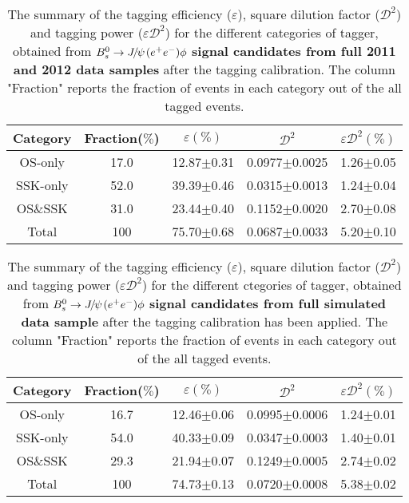 \begin{table}[htb]
  \caption{
   The summary of the tagging efficiency ($\varepsilon$), square dilution factor ($\mathcal{D}^{2}$) and tagging power ($\varepsilon\mathcal{D}^{2}$) for the different categories of tagger, obtained from ${{B}^0_{s}}\rightarrow{\ensuremath{{J\mskip -3mu/\mskip -2mu\psi\mskip 2mu}}}({e^+e^-})\phi$ {\bf signal candidates from full 2011 and 2012 data samples} after the tagging calibration. The column "Fraction" reports the fraction of events in each category out of the all tagged events. }
    \small{
\begin{center}\begin{tabular}{ccccc}
   \hline
    Category & Fraction($\%$)&$\varepsilon(\%)$ & $\mathcal{D}^{2}$ & $\varepsilon\mathcal{D}^{2}(\%)$\\
  \hline
    OS-only& 17.0 &12.87$\pm$0.31 &  0.0977$\pm$0.0025  &1.26$\pm$0.05 \\
     SSK-only& 52.0 &39.39$\pm$0.46 & 0.0315$\pm$0.0013 & 1.24$\pm$0.04 \\
     OS$\&$SSK& 31.0 &23.44$\pm$0.40 &  0.1152$\pm$0.0020  &2.70$\pm$0.08 \\
    \hline
     Total& 100 &75.70$\pm$0.68 & 0.0687$\pm$0.0033 & 5.20$\pm$0.10 \\
    \hline
    \end{tabular}\end{center}
  }
\label{tab:FTperformanceRDfull}
\end{table}
\begin{table}[htb]
  \caption{
   The summary of the tagging efficiency ($\varepsilon$), square dilution factor ($\mathcal{D}^{2}$) and tagging power ($\varepsilon\mathcal{D}^{2}$) for the different ctegories of tagger, obtained from ${{B}^0_{s}}\rightarrow{\ensuremath{{J\mskip -3mu/\mskip -2mu\psi\mskip 2mu}}}({e^+e^-})\phi$ {\bf signal candidates from full simulated data sample} after the tagging calibration has been applied. The column "Fraction" reports the fraction of events in each category out of the all tagged events. }
    \small{
\begin{center}\begin{tabular}{ccccc}
   \hline
    Category & Fraction($\%$)&$\varepsilon(\%)$ & $\mathcal{D}^{2}$ & $\varepsilon\mathcal{D}^{2}(\%)$\\
  \hline
    OS-only& 16.7 &12.46$\pm$0.06 &  0.0995$\pm$0.0006 &  1.24$\pm$0.01 \\
     SSK-only& 54.0&40.33$\pm$0.09 &  0.0347$\pm$0.0003 &  1.40$\pm$0.01 \\
     OS$\&$SSK& 29.3&21.94$\pm$0.07 &  0.1249$\pm$0.0005 &  2.74$\pm$0.02 \\
    \hline
     Total& 100 &74.73$\pm$0.13 & 0.0720$\pm$0.0008 & 5.38$\pm$0.02 \\
    \hline
    \end{tabular}\end{center}
  }
\label{tab:FTperformanceMCfull}
\end{table}

